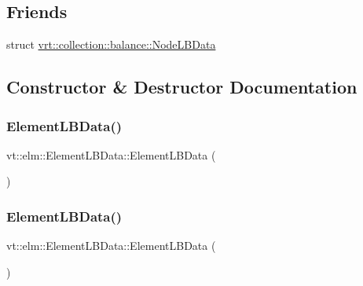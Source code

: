 \subsection*{Friends}
\begin{DoxyCompactItemize}
\item 
struct \hyperlink{structvt_1_1elm_1_1_element_l_b_data_a311da2f5cb4a09f74eaf7c15569996a9}{vrt\+::collection\+::balance\+::\+Node\+L\+B\+Data}
\end{DoxyCompactItemize}


\subsection{Constructor \& Destructor Documentation}
\mbox{\label{structvt_1_1elm_1_1_element_l_b_data_aa7a5f68f276e0d3ae1279bb0f3050e4d}} 
\subsubsection{\texorpdfstring{Element\+L\+B\+Data()}{ElementLBData()}\hspace{0.1cm}{\footnotesize\ttfamily [1/3]}}
{\footnotesize\ttfamily vt\+::elm\+::\+Element\+L\+B\+Data\+::\+Element\+L\+B\+Data (\begin{DoxyParamCaption}{ }\end{DoxyParamCaption})\hspace{0.3cm}{\ttfamily [default]}}

\mbox{\label{structvt_1_1elm_1_1_element_l_b_data_a2aa0d177c123d04ac24342b9558f3c46}} 
\subsubsection{\texorpdfstring{Element\+L\+B\+Data()}{ElementLBData()}\hspace{0.1cm}{\footnotesize\ttfamily [2/3]}}
{\footnotesize\ttfamily vt\+::elm\+::\+Element\+L\+B\+Data\+::\+Element\+L\+B\+Data (\begin{DoxyParamCaption}\item[{\hyperlink{structvt_1_1elm_1_1_element_l_b_data}{Element\+L\+B\+Data} const \&}]{ }\end{DoxyParamCaption})\hspace{0.3cm}{\ttfamily [default]}}

